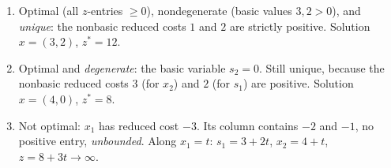 \begin{solutions}
  \item
        \begin{enumerate}[label=(\alph*),leftmargin=1.8em,itemsep=0.3ex]
          \item Optimal (all $z$-entries $\ge 0$), nondegenerate (basic
                values $3,2>0$), and \emph{unique}: the nonbasic reduced
                costs $1$ and $2$ are strictly positive. Solution
                $x=(3,2)$, $z^{*}=12$.
          \item Optimal and \emph{degenerate}: the basic variable $s_2=0$.
                Still unique, because the nonbasic reduced costs $3$ (for
                $x_2$) and $2$ (for $s_1$) are positive. Solution
                $x=(4,0)$, $z^{*}=8$.
          \item Not optimal: $x_1$ has reduced cost $-3$. Its column
                contains $-2$ and $-1$, no positive entry,
                \emph{unbounded}. Along $x_1=t$: $s_1=3+2t$, $x_2=4+t$,
                $z=8+3t\to\infty$.
        \end{enumerate}


\end{solutions}
